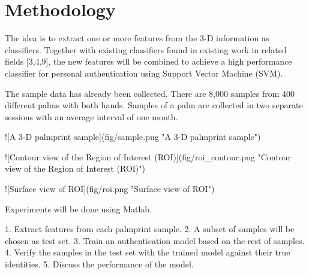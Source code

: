 
\chapter{Methodology\label{ch:methodology}}

The idea is to extract one or more features from the 3-D information as classifiers. Together with existing classifiers found in existing work in related fields [3,4,9], the new features will be combined to achieve a high performance classifier for personal authentication using Support Vector Machine (SVM).

The sample data has already been collected. There are 8,000 samples from 400 different palms with both hands. Samples of a palm are collected in two separate sessions with an average interval of one month.

![A 3-D palmprint sample](fig/sample.png "A 3-D palmprint sample")

![Contour view of the Region of Interest (ROI)](fig/roi_contour.png "Contour view of the Region of Interest (ROI)")

![Surface view of ROI](fig/roi.png "Surface view of ROI")

Experiments will be done using Matlab.

1. Extract features from each palmprint sample.
2. A subset of samples will be chosen as test set.
3. Train an authentication model based on the rest of samples.
4. Verify the samples in the test set with the trained model against their true identities.
5. Discuss the performance of the model.


